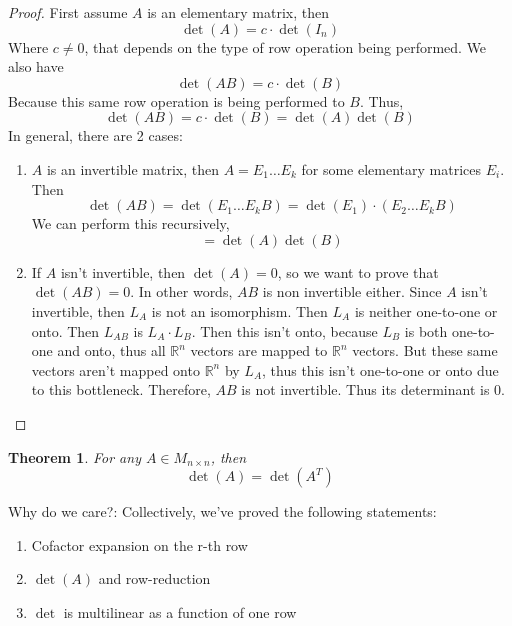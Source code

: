\documentclass{article}
\newtheorem{theorem}{Theorem}[section]
\newtheorem{one minute paper}[theorem]{One Minute Paper}
\begin{document}
\begin{proof}
    First assume $A$ is an elementary matrix, then 
    \begin{equation}
        \det(A) = c\cdot \det(I_n)
    \end{equation}
    Where $c \neq 0$, that depends on the type of row operation being performed. We also have 
    \begin{equation}
        \det(AB) = c\cdot \det(B)
    \end{equation}
    Because this same row operation is being performed to $B$. Thus, 
    \begin{equation}
        \det(AB) = c \cdot \det(B) = \det(A)\det(B)
    \end{equation} 
    In general, there are 2 cases:
    \begin{enumerate}
        \item $A$ is an invertible matrix, then $A = E_1\dots E_k$ for some elementary matrices $E_i$. Then 
        \begin{equation}
            \det(AB) = \det(E_1\dots E_k B) = \det(E_1) \cdot(E_2 \dots E_k B) 
        \end{equation}
        We can perform this recursively, 
        \begin{equation}
            = \det(A)\det(B)
        \end{equation}
        \item If $A$ isn't invertible, then $\det(A) = 0$, so we want to prove that $\det(AB) = 0$. In other words, $AB$ is non invertible either. Since $A$ isn't invertible, then $L_A$ is not an isomorphism. Then $L_A$ is
        neither one-to-one or onto. Then $L_{AB}$ is $L_A \cdot L_B$. Then this isn't onto, because $L_B$ is both one-to-one and onto, thus all $\mathbb{R}^n$ vectors are mapped to $\mathbb{R}^n$ vectors. 
        But these same vectors aren't mapped onto $\mathbb{R}^n$ by $L_A$, thus this isn't one-to-one or onto due to this bottleneck. Therefore, $AB$ is not invertible. Thus its determinant is $0$. 
    \end{enumerate}
\end{proof}

\begin{theorem}
    For any $A \in M_{n \times n}$, then 
    \begin{equation}
        \det(A) = \det(A^T)
    \end{equation}
\end{theorem}

Why do we care?: Collectively, we've proved the following statements:
\begin{enumerate}
    \item Cofactor expansion on the r-th row
    \item $\det(A)$ and row-reduction
    \item $\det$ is multilinear as a function of one row
\end{enumerate}
\end{document}
